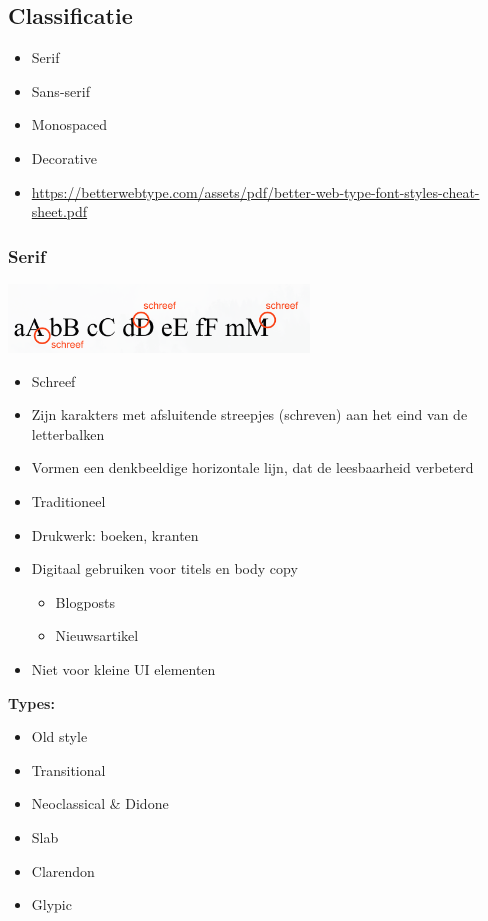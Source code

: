 \documentclass{article}
\newcommand{\bold}[1]{\textbf{#1}}
\begin{document}
\subsection{Classificatie}
\begin{itemize}
    \item Serif
    \item Sans-serif
    \item Monospaced
    \item Decorative
    \item \url{https://betterwebtype.com/assets/pdf/better-web-type-font-styles-cheat-sheet.pdf}
\end{itemize}

\subsubsection{Serif}

\includegraphics[width=0.6\textwidth]{img/Screenshot_20200224_084536.png}

\begin{itemize}
    \item Schreef
    \item Zijn karakters met afsluitende streepjes (schreven) aan het eind van de letterbalken
    \item Vormen een denkbeeldige horizontale lijn, dat de leesbaarheid verbeterd
    \item Traditioneel
    \item Drukwerk: boeken, kranten
    \item Digitaal gebruiken voor titels en body copy
    \begin{itemize}
        \item Blogposts
        \item Nieuwsartikel
    \end{itemize}
    \item Niet voor kleine UI elementen
\end{itemize}


\bold{Types:}
\begin{itemize}
    \item Old style
    \item Transitional
    \item Neoclassical \& Didone
    \item Slab
    \item Clarendon
    \item Glypic
\end{itemize}
\end{document}
